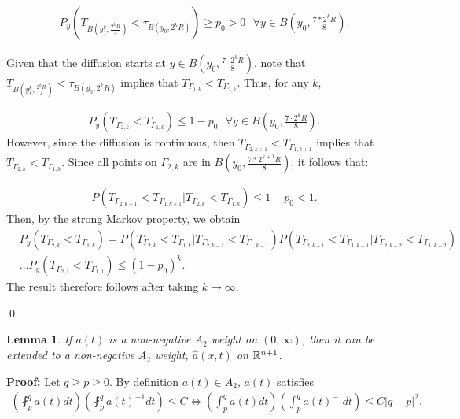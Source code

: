 \documentclass{article}
\newtheorem{lemma}[theorem]{Lemma}
\begin{document}
\begin{align*}
    P_y(T_{B(y_1^k, \frac{2^kR}{4})} < \tau_{B(y_0, 2^kR)}) \ge p_0 > 0 \textrm{  } \forall y \in B\left(y_0, \frac{7*2^kR}{8}\right).
    \tag{6.3}\label{eq: 6.3}
\end{align*}

Given that the diffusion starts at $y \in B(y_0, \frac{7 \cdot 2^kR}{8})$, note that $T_{B(y_1^k, \frac{2^kR}{4})} < \tau_{B(y_0, 2^kR)}$ implies that $T_{\Gamma_{1,k}}<T_{\Gamma_{2,k}}$. Thus, for any $k$,

\begin{align*}
P_y(T_{\Gamma_{2,k}}<T_{\Gamma_{1,k}}) \le 1-p_0 \textrm{  } \forall y \in B\left(y_0, \frac{7 \cdot 2^kR}{8}\right).
\tag{6.4}\label{eq: 6.4}
\end{align*}
However, since the diffusion is continuous, then $T_{\Gamma_{2,k+1}}<T_{\Gamma_{1,k+1}}$ implies that $T_{\Gamma_{2,k}}<T_{\Gamma_{1,k}}$. Since all points on $\Gamma_{2,k}$ are in $B(y_0, \frac{7*2^{k+1}R}{8})$, it follows that:

\begin{align*}
    P(T_{\Gamma_{2,k+1}}<T_{\Gamma_{1,k+1}}| T_{\Gamma_{2,k}}<T_{\Gamma_{1,k}}) \le 1-p_0 < 1.
    \tag{6.5}\label{eq: 6.5}
\end{align*}
Then, by the strong Markov property, we obtain 
\begin{align*}
    &P_y(T_{\Gamma_{2,k}}<T_{\Gamma_{1,k}}) = P(T_{\Gamma_{2,k}}<T_{\Gamma_{1,k}}| T_{\Gamma_{2,k-1}}<T_{\Gamma_{1,k-1}})P(T_{\Gamma_{2,k-1}}<T_{\Gamma_{1,k-1}}| T_{\Gamma_{2,k-2}}<T_{\Gamma_{1,k-2}})\\
    &...P_y(T_{\Gamma_{2,1}}<T_{\Gamma_{1,1}}) \le (1-p_0)^k.
    \tag{6.6}\label{eq: 6.6}
\end{align*}
The result therefore follows after taking $k \to \infty$.

 \qed
 
 \begin{lemma}
 \label{lm 6.2}
If $a(t)$ is a non-negative $A_2$ weight on $(0, \infty)$, then it can be extended to a non-negative $A_2$ weight, $\hat{a}(x,t)$ on $\mathbb{R}^{n+1}$.
\end{lemma}

\noindent
\textbf{Proof:} Let $q \ge p \ge 0$. By definition $a(t) \in A_2$, $a(t)$ satisfies
\begin{align*}
    \left(\fint_p^q a(t) dt\right) \left(\fint_p^q a(t)^{-1} dt\right) \le C \iff \left(\int_p^q a(t) dt\right) \left(\int_p^q a(t)^{-1} dt\right) \le C|q-p|^2.
    \tag{6.7}\label{eq: 6.7}
\end{align*} 
\end{document}
